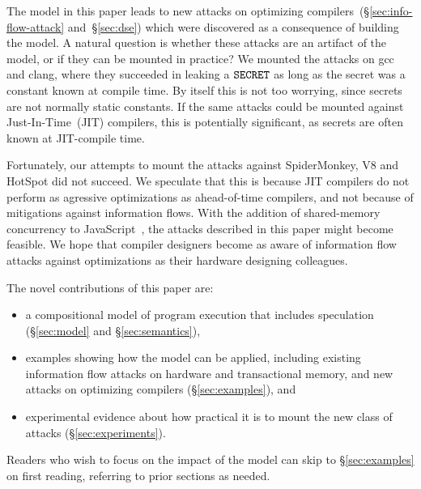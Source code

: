 The model in this paper leads to new attacks on optimizing
compilers~(\S\ref{sec:info-flow-attack} and~\S\ref{sec:dse}) which
were discovered as a consequence of building the model. A natural
question is whether these attacks are an artifact of the model, or if
they can be mounted in practice? We mounted the attacks on gcc and
clang, where they succeeded in leaking a $\texttt{SECRET}$ as long as the secret
was a constant known at compile time. By itself this is not too
worrying, since secrets are not normally static constants. If the same
attacks could be mounted against Just-In-Time~(JIT) compilers, this
is potentially significant, as secrets are often known at JIT-compile
time.

Fortunately, our attempts to mount the attacks against SpiderMonkey,
V8 and HotSpot did not succeed. We speculate that this is because
JIT compilers do not perform as agressive optimizations as
ahead-of-time compilers, and not because of mitigations against
information flows. With the addition of shared-memory concurrency
to JavaScript~\cite[\S24.2]{ecma-262}, the attacks described in this paper might
become feasible. We hope that compiler designers become as
aware of information flow attacks against optimizations as their
hardware designing colleagues.

The novel contributions of this paper are:
\begin{itemize}

\item a compositional model of program execution that includes speculation
  (\S\ref{sec:model} and \S\ref{sec:semantics}),

\item examples showing how the model can be applied,
  including existing information flow attacks on
  hardware and transactional memory, and new attacks on optimizing compilers (\S\ref{sec:examples}), and

\item experimental evidence about how practical it is to mount
  the new class of attacks (\S\ref{sec:experiments}).

\end{itemize}
Readers who wish to focus on the impact of the model can skip to \S\ref{sec:examples}
on first reading, referring to prior sections as needed.
